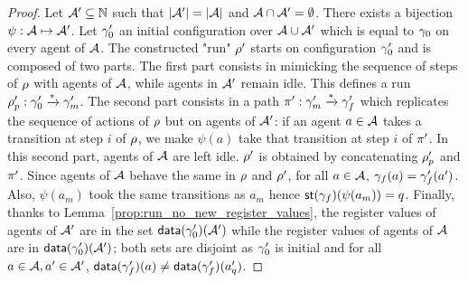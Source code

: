 \begin{proof}
Let $\mathcal{A}' \subseteq \mathbb{N}$ such that $|\mathcal{A}'|= |\mathcal{A}|$ and $\mathcal{A} \cap \mathcal{A}' = \emptyset$.
There exists a bijection $\psi: \mathcal{A} \mapsto \mathcal{A}'$. Let $\gamma_0'$ an initial configuration over $\mathcal{A} \cup \mathcal{A}'$ which is equal to $\gamma_0$ on every agent of $\mathcal{A}$. 
The constructed "run" $\rho'$ starts on configuration $\gamma_0'$ and is composed of two parts. 
The first part consists in mimicking the sequence of steps of $\rho$ with agents of $\mathcal{A}$, while agents in $\mathcal{A}'$ remain idle. This defines a run $\rho_p' : \gamma_0' \xrightarrow{*}  \gamma_m'$.  
The second part consists in a path $\pi': \gamma_m' \xrightarrow{*} \gamma_f'$ which replicates the sequence of actions of $\rho$ but on agents of $\mathcal{A}'$: if an agent $a \in \mathcal{A}$ takes a transition at step $i$ of $\rho$, we make $\psi(a)$ take that transition at step $i$ of $\pi'$.
In this second part, agents of $\mathcal{A}$ are left idle. $\rho'$ is obtained by concatenating $\rho_p'$ and $\pi'$. Since agents of $\mathcal{A}$ behave the same in $\rho$ and $\rho'$, for all $a \in \mathcal{A}$, $\gamma_f(a) = \gamma_f'(a')$. Also, $\psi(a_m)$ took the same transitions as $a_m$ hence $\mathsf{st}(\gamma_f)(\psi(a_m)) = q$. Finally, thanks to Lemma~\ref{prop:run_no_new_register_values}, the register values of agents of $\mathcal{A}'$ are in the set $\mathsf{data}(\gamma_0')(\mathcal{A}')$ while the register values of agents of $\mathcal{A}$ are in $\mathsf{data}(\gamma_0')(\mathcal{A}')$; both sets are disjoint as $\gamma_0'$ is initial and for all $a \in \mathcal{A}, a' \in \mathcal{A}'$, $\mathsf{data}(\gamma_f')(a) \ne \mathsf{data}(\gamma_f')(a'_q)$.
\end{proof}


